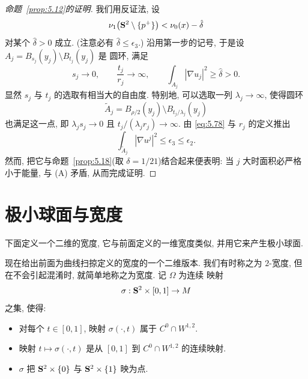 \begin{proof}[命题~\ref{prop:5.12}的证明]
我们用反证法, 设
\begin{equation}
\nu_1\bigl(\mathbf{S}^2\setminus\{p^+\}\bigr)<\nu_0(x)-\hat{\delta}
\label{eq:5.77}
\end{equation}
对某个 $\hat{\delta}>0$ 成立. (注意必有 $\hat{\delta}\leq\epsilon_3$.)
沿用第一步的记号, 于是设 $A_j=B_{s_j}(y_j)\setminus B_{t_j}(y_j)$ 是
圆环, 满足
\begin{equation}
s_j\to 0,\qquad \frac{t_j}{r_j}\to\infty,\qquad
\int_{A_j}|\nabla u_j|^2\geq\hat{\delta}>0.
\label{eq:5.78}
\end{equation}
显然 $s_j$ 与 $t_j$ 的选取有相当大的自由度. 特别地, 可以选取一列
$\lambda_j\to\infty$, 使得圆环
\begin{equation}
\tilde{A}_j=B_{\rho/2}(y_j)\setminus B_{t_j/\lambda_j}(y_j)
\label{eq:5.79}
\end{equation}
也满足这一点, 即 $\lambda_js_j\to 0$ 且
$t_j/(\lambda_jr_j)\to\infty$. 由 \eqref{eq:5.78} 与 $r_j$ 的定义推出
\begin{equation}
\int_{\tilde{A}_j}|\nabla u^j|^2\leq\epsilon_3\leq\epsilon_2.
\label{eq:5.80}
\end{equation}
然而, 把它与命题~\ref{prop:5.18}(取 $\delta=1/21$)结合起来便表明: 当
$j$ 大时面积必严格小于能量, 与 (A) 矛盾, 从而完成证明.
\end{proof}

\section{极小球面与宽度}
\label{sec:5.5}

下面定义一个二维的宽度, 它与前面定义的一维宽度类似, 并用它来产生极小球面.

现在给出前面为曲线扫掠定义的宽度的一个二维版本. 我们有时称之为
$2$-宽度, 但在不会引起混淆时, 就简单地称之为宽度. 记 $\Omega$ 为连续
映射
\begin{equation*}
\sigma:\mathbf{S}^2\times[0,1]\to M
\end{equation*}
之集, 使得:

\begin{itemize}[leftmargin=1.8em,itemsep=1pt,topsep=2pt]
\item 对每个 $t\in[0,1]$, 映射 $\sigma(\cdot,t)$ 属于 $C^0\cap W^{1,2}$.
\item 映射 $t\mapsto\sigma(\cdot,t)$ 是从 $[0,1]$ 到 $C^0\cap W^{1,2}$
      的连续映射.
\item $\sigma$ 把 $\mathbf{S}^2\times\{0\}$ 与 $\mathbf{S}^2\times\{1\}$ 映为点.
\end{itemize}

